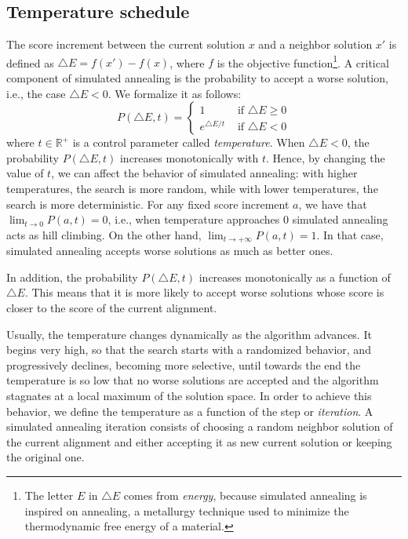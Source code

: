 \documentclass[]{article}
\begin{document}
\subsection{Temperature schedule}

The score increment between the current solution $x$ and a neighbor solution $x'$ is defined as $\triangle E = f(x')-f(x)$, where $f$ is the objective function\footnote{The letter $E$ in $\triangle E$ comes from \textit{energy}, because simulated annealing is inspired on annealing, a metallurgy technique used to minimize the thermodynamic free energy of a material.}.
A critical component of simulated annealing is the probability to accept a worse solution, i.e., the case $\triangle E < 0$. We formalize it as follows:
$$P(\triangle E, t)=\begin{cases}
 1& \text{ if } \triangle E\geq 0 \\ 
 e^{\triangle E/t}& \text{ if } \triangle E < 0 
\end{cases}$$
where $t\in \mathbb{R^+}$ is a control parameter called \textit{temperature}. When $\triangle E < 0$, the probability $P(\triangle E, t)$ increases monotonically with $t$. Hence, by changing the value of $t$, we can affect the behavior of simulated annealing: with higher temperatures, the search is more random, while with lower temperatures, the search is more deterministic. For any fixed score increment $a$, we have that $\lim_{t\rightarrow 0} {P(a, t)}=0$, i.e., when temperature approaches 0 simulated annealing acts as hill climbing. On the other hand, $\lim_{t\rightarrow +\infty} {P(a, t)}=1$. In that case, simulated annealing accepts worse solutions as much as better ones. 

In addition, the probability $P(\triangle E, t)$ increases monotonically as a function of $\triangle E$. This means that it is more likely to accept worse solutions whose score is closer to the score of the current alignment.

Usually, the temperature changes dynamically as the algorithm advances. It begins very high, so that the search starts with a randomized behavior, and progressively declines, becoming more selective, until towards the end the temperature is so low that no worse solutions are accepted and the algorithm stagnates at a local maximum of the solution space. In order to achieve this behavior, we define the temperature as a function of the step or \textit{iteration}. A simulated annealing iteration consists of choosing a random neighbor solution of the current alignment and either accepting it as new current solution or keeping the original one.
\end{document}
